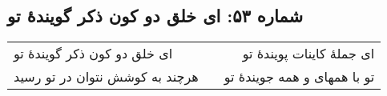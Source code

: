 \begin{center}
\section*{شماره ۵۳: ای خلق دو کون ذکر گویندۀ تو}
\label{sec:053}
\begin{longtable}{l p{0.5cm} r}
ای خلق دو کون ذکر گویندهٔ تو
&&
ای جملهٔ کاینات پویندهٔ تو
\\
هرچند به کوشش نتوان در تو رسید
&&
تو با همهای و همه جویندهٔ تو
\\
\end{longtable}
\end{center}
